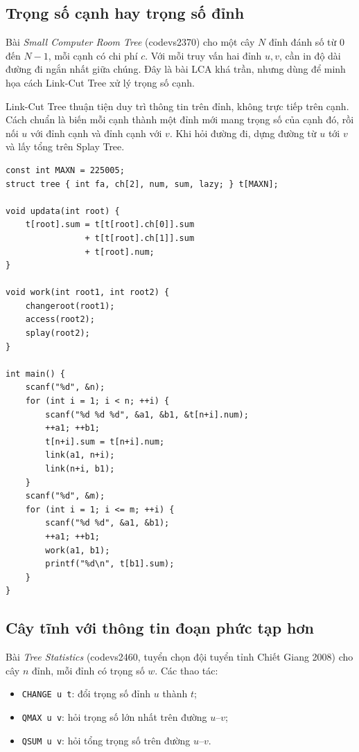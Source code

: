 \documentclass[11pt]{article}
\begin{document}
\subsection{Trọng số cạnh hay trọng số đỉnh}

Bài \textit{Small Computer Room Tree} (codevs2370) cho một cây $N$ đỉnh đánh
số từ $0$ đến $N-1$, mỗi cạnh có chi phí $c$.  Với mỗi truy vấn hai đỉnh
$u,v$, cần in độ dài đường đi ngắn nhất giữa chúng.  Đây là bài LCA khá trần,
nhưng dùng để minh họa cách Link-Cut Tree xử lý trọng số cạnh.

Link-Cut Tree thuận tiện duy trì thông tin trên đỉnh, không trực tiếp trên
cạnh.  Cách chuẩn là biến mỗi cạnh thành một đỉnh mới mang trọng số của cạnh
đó, rồi nối $u$ với đỉnh cạnh và đỉnh cạnh với $v$.  Khi hỏi đường đi, dựng
đường từ $u$ tới $v$ và lấy tổng trên Splay Tree.

\begingroup
\small
\begin{verbatim}
const int MAXN = 225005;
struct tree { int fa, ch[2], num, sum, lazy; } t[MAXN];

void updata(int root) {
    t[root].sum = t[t[root].ch[0]].sum
                + t[t[root].ch[1]].sum
                + t[root].num;
}

void work(int root1, int root2) {
    changeroot(root1);
    access(root2);
    splay(root2);
}

int main() {
    scanf("%d", &n);
    for (int i = 1; i < n; ++i) {
        scanf("%d %d %d", &a1, &b1, &t[n+i].num);
        ++a1; ++b1;
        t[n+i].sum = t[n+i].num;
        link(a1, n+i);
        link(n+i, b1);
    }
    scanf("%d", &m);
    for (int i = 1; i <= m; ++i) {
        scanf("%d %d", &a1, &b1);
        ++a1; ++b1;
        work(a1, b1);
        printf("%d\n", t[b1].sum);
    }
}
\end{verbatim}
\endgroup

\subsection{Cây tĩnh với thông tin đoạn phức tạp hơn}

Bài \textit{Tree Statistics} (codevs2460, tuyển chọn đội tuyển tỉnh Chiết
Giang 2008) cho cây $n$ đỉnh, mỗi đỉnh có trọng số $w$.  Các thao tác:
\begin{itemize}
  \item \texttt{CHANGE u t}: đổi trọng số đỉnh $u$ thành $t$;
  \item \texttt{QMAX u v}: hỏi trọng số lớn nhất trên đường $u$--$v$;
  \item \texttt{QSUM u v}: hỏi tổng trọng số trên đường $u$--$v$.
\end{itemize}
\end{document}
